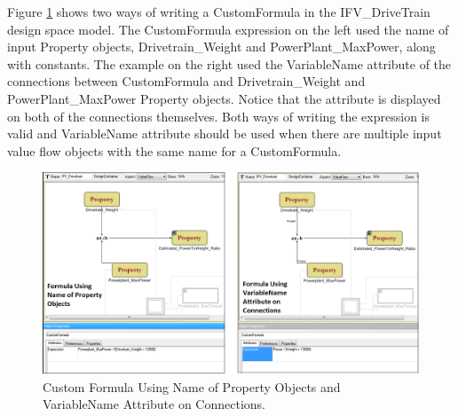 Figure \ref{fig:customformula} shows two ways of writing a CustomFormula in the IFV\_DriveTrain design space model. The CustomFormula expression on the left used the name of input Property objects, Drivetrain\_Weight and PowerPlant\_MaxPower, along with constants. The example on the right used the VariableName attribute of the connections between CustomFormula and Drivetrain\_Weight and PowerPlant\_MaxPower Property objects. Notice that the attribute is displayed on both of the connections themselves. Both ways of writing the expression is valid and VariableName attribute should be used when there are multiple input value flow objects with the same name for a CustomFormula. 
\begin{figure}
\centering
\includegraphics[scale=0.40]{Figures/customFormula_VF.png}
\caption{Custom Formula Using Name of Property Objects and VariableName Attribute on Connections.}
\label{fig:customformula}
\end{figure}


